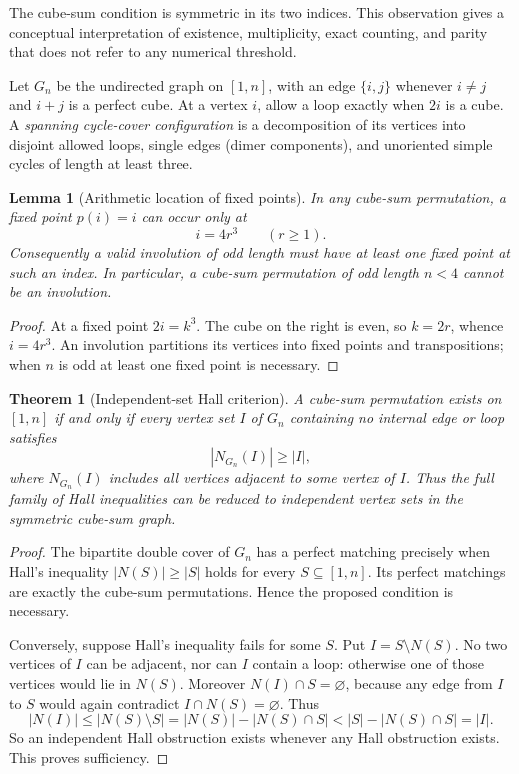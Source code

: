 \documentclass[10pt]{article}
\newtheorem{theorem}{Theorem}
\newtheorem{lemma}{Lemma}
\begin{document}
The cube-sum condition is symmetric in its two indices.
This observation gives a conceptual interpretation of
existence, multiplicity, exact counting, and parity that
does not refer to any numerical threshold.

Let $G_n$ be the undirected graph on $[1,n]$,
with an edge $\{i,j\}$ whenever $i\ne j$
and $i+j$ is a perfect cube. At a vertex $i$,
allow a loop exactly when $2i$ is a cube.
A \emph{spanning cycle-cover configuration}
is a decomposition of its vertices into
disjoint allowed loops, single edges
(dimer components), and unoriented simple
cycles of length at least three.

\begin{lemma}[Arithmetic location of fixed points]
\label{lem:fixedpoints}
In any cube-sum permutation, a fixed point
$p(i)=i$ can occur only at
\[
\boxed{i=4r^3\qquad(r\ge1).}
\]
Consequently a valid involution of odd
length must have at least one fixed point
at such an index. In particular, a
cube-sum permutation of odd length
$n<4$ cannot be an involution.
\end{lemma}
\begin{proof}
At a fixed point $2i=k^3$.
The cube on the right is even, so
$k=2r$, whence $i=4r^3$.
An involution partitions its vertices
into fixed points and transpositions;
when $n$ is odd at least one fixed
point is necessary.
\end{proof}

\begin{theorem}[Independent-set Hall criterion]
\label{thm:independent-hall}
A cube-sum permutation exists on $[1,n]$
if and only if every vertex set $I$ of
$G_n$ containing no internal edge
\emph{or loop} satisfies
\begin{equation}\label{eq:independent-hall}
\boxed{|N_{G_n}(I)|\ge |I|,}
\end{equation}
where $N_{G_n}(I)$ includes all vertices
adjacent to some vertex of $I$.
Thus the full family of Hall inequalities
can be reduced to \emph{independent}
vertex sets in the symmetric cube-sum graph.
\end{theorem}
\begin{proof}
The bipartite double cover of $G_n$
has a perfect matching precisely when
Hall's inequality $|N(S)|\ge|S|$
holds for every $S\subseteq[1,n]$.
Its perfect matchings are exactly
the cube-sum permutations.
Hence the proposed condition is necessary.

Conversely, suppose Hall's inequality
fails for some $S$. Put
$I=S\setminus N(S)$.
No two vertices of $I$ can be adjacent,
nor can $I$ contain a loop: otherwise
one of those vertices would lie in
$N(S)$.
Moreover $N(I)\cap S=\varnothing$,
because any edge from $I$ to $S$
would again contradict $I\cap N(S)=
\varnothing$. Thus
\[
|N(I)|\le |N(S)\setminus S|
=|N(S)|-|N(S)\cap S|
<|S|-|N(S)\cap S|=|I|.
\]
So an independent Hall obstruction
exists whenever any Hall obstruction
exists. This proves sufficiency.
\end{proof}
\end{document}
